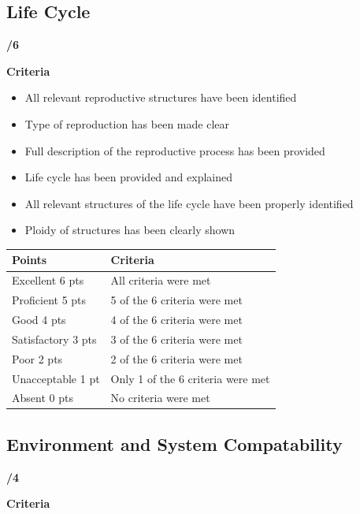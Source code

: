 \documentclass[
]{book}
\providecommand{\tightlist}{%
  \setlength{\itemsep}{0pt}\setlength{\parskip}{0pt}}
\begin{document}
\hypertarget{life-cycle}{%
\subsection*{Life Cycle}\label{life-cycle}}

\textbf{/6}

\textbf{Criteria}

\begin{itemize}
\tightlist
\item
  All relevant reproductive structures have been identified
\item
  Type of reproduction has been made clear
\item
  Full description of the reproductive process has been provided
\item
  Life cycle has been provided and explained
\item
  All relevant structures of the life cycle have been properly identified
\item
  Ploidy of structures has been clearly shown
\end{itemize}

\begin{longtable}[]{@{}ll@{}}
\toprule
Points & Criteria \\
\midrule
\endhead
Excellent 6 pts & All criteria were met \\
Proficient 5 pts & 5 of the 6 criteria were met \\
Good 4 pts & 4 of the 6 criteria were met \\
Satisfactory 3 pts & 3 of the 6 criteria were met \\
Poor 2 pts & 2 of the 6 criteria were met \\
Unacceptable 1 pt & Only 1 of the 6 criteria were met \\
Absent 0 pts & No criteria were met \\
\bottomrule
\end{longtable}

\hypertarget{environment-and-system-compatability}{%
\subsection*{Environment and System Compatability}\label{environment-and-system-compatability}}

\textbf{/4}

\textbf{Criteria}
\end{document}
